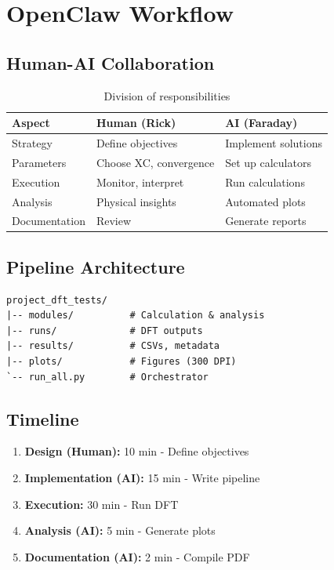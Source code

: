 \documentclass[11pt,a4paper]{article}
\begin{document}
\section{OpenClaw Workflow}

\subsection{Human-AI Collaboration}

\begin{table}[h]
\centering
\small
\begin{tabular}{p{}p{}p{}}
\toprule
\textbf{Aspect} & \textbf{Human (Rick)} & \textbf{AI (Faraday)} \\
\midrule
Strategy & Define objectives & Implement solutions \\
Parameters & Choose XC, convergence & Set up calculators \\
Execution & Monitor, interpret & Run calculations \\
Analysis & Physical insights & Automated plots \\
Documentation & Review & Generate reports \\
\bottomrule
\end{tabular}
\caption{Division of responsibilities}
\end{table}

\subsection{Pipeline Architecture}

\begin{verbatim}
project_dft_tests/
|-- modules/          # Calculation & analysis
|-- runs/             # DFT outputs
|-- results/          # CSVs, metadata
|-- plots/            # Figures (300 DPI)
`-- run_all.py        # Orchestrator
\end{verbatim}

\subsection{Timeline}

\begin{enumerate}
    \item \textbf{Design (Human):} 10 min - Define objectives
    \item \textbf{Implementation (AI):} 15 min - Write pipeline
    \item \textbf{Execution:} 30 min - Run DFT
    \item \textbf{Analysis (AI):} 5 min - Generate plots
    \item \textbf{Documentation (AI):} 2 min - Compile PDF
\end{enumerate}
\end{document}
